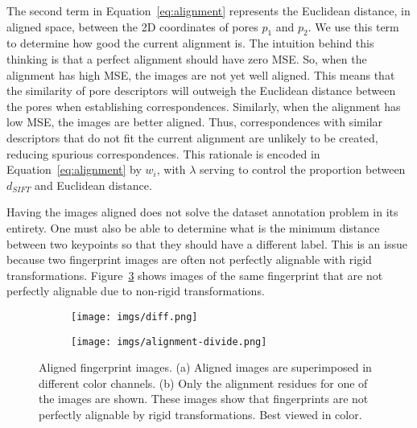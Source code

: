 \documentclass[10pt,twocolumn,letterpaper]{article}
\begin{document}
The second term in Equation~\ref{eq:alignment} represents the Euclidean distance, in aligned space, between the 2D coordinates of pores $p_1$ and $p_2$.
We use this term to determine how good the current alignment is.
The intuition behind this thinking is that a perfect alignment should have zero MSE.
So, when the alignment has high MSE, the images are not yet well aligned.
This means that the similarity of pore descriptors will outweigh the Euclidean distance between the pores when establishing correspondences.
Similarly, when the alignment has low MSE, the images are better aligned.
Thus, correspondences with similar descriptors that do not fit the current alignment are unlikely to be created, reducing spurious correspondences.
This rationale is encoded in Equation~\ref{eq:alignment} by $w_i$, with $\lambda$ serving to control the proportion between $d_\mathit{SIFT}$ and Euclidean distance.


Having the images aligned does not solve the dataset annotation problem in its entirety.
One must also be able to determine what is the minimum distance between two keypoints so that they should have a different label.
This is an issue because two fingerprint images are often not perfectly alignable with rigid transformations.
Figure~\ref{fig:align} shows images of the same fingerprint that are not perfectly alignable due to non-rigid transformations.

\begin{figure}[h]
  \begin{center}
    \begin{subfigure}{0.48\linewidth}
      \texttt{[image: imgs/diff.png]}
      \caption{\label{fig:align1}}
    \end{subfigure}
    \begin{subfigure}{0.48\linewidth}
      \texttt{[image: imgs/alignment-divide.png]}
      \caption{\label{fig:align2}}
    \end{subfigure}
  \end{center}
  \caption{Aligned fingerprint images.
  (a) Aligned images are superimposed in different color channels.
  (b) Only the alignment residues for one of the images are shown.
  These images show that fingerprints are not perfectly alignable by rigid transformations.
  Best viewed in color.
  }
  \label{fig:align}
\end{figure}
\end{document}
